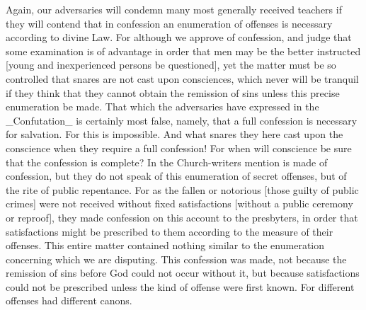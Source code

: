 Again, our adversaries will condemn many most generally received
teachers if they will contend that in confession an enumeration of
offenses is necessary according to divine Law.  For although we
approve of confession, and judge that some examination is of
advantage in order that men may be the better instructed [young and
inexperienced persons be questioned], yet the matter must be so
controlled that snares are not cast upon consciences, which never
will be tranquil if they think that they cannot obtain the remission
of sins unless this precise enumeration be made.  That which the
adversaries have expressed in the _Confutation_ is certainly most
false, namely, that a full confession is necessary for salvation.
For this is impossible.  And what snares they here cast upon the
conscience when they require a full confession!  For when will
conscience be sure that the confession is complete?  In the
Church-writers mention is made of confession, but they do not speak
of this enumeration of secret offenses, but of the rite of public
repentance.  For as the fallen or notorious [those guilty of public
crimes] were not received without fixed satisfactions [without a
public ceremony or reproof], they made confession on this account to
the presbyters, in order that satisfactions might be prescribed to
them according to the measure of their offenses.  This entire matter
contained nothing similar to the enumeration concerning which we are
disputing.  This confession was made, not because the remission of
sins before God could not occur without it, but because satisfactions
could not be prescribed unless the kind of offense were first known.
For different offenses had different canons.

